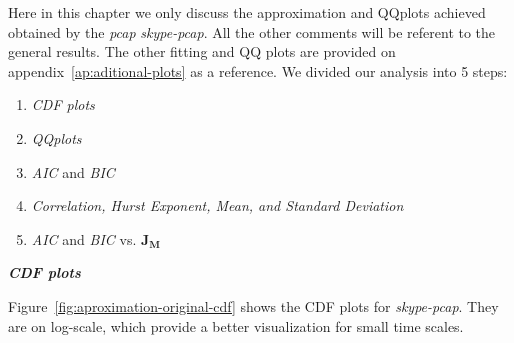 Here in this chapter we only discuss the approximation and QQplots achieved obtained by the \textit{pcap} \textit{skype-pcap}. All the other comments will be referent to the general results. The other fitting and QQ plots are provided on appendix~\ref{ap:aditional-plots} as a reference. 
We divided our analysis into 5 steps:
\begin{enumerate}
    \item \textit{CDF plots}
    \item \textit{QQplots}
    \item \textit{AIC} and \textit{BIC}
    \item \textit{Correlation, Hurst Exponent, Mean, and Standard Deviation} 
    \item  \textit{AIC} and \textit{BIC} vs. $\boldsymbol{J_M}$ 
\end{enumerate} 

\smallskip \noindent \textbf{\textit{CDF plots}}

Figure~\ref{fig:aproximation-original-cdf}  shows the CDF plots for \textit{skype-pcap}. They are on log-scale, which provide a better visualization for small time scales. 

